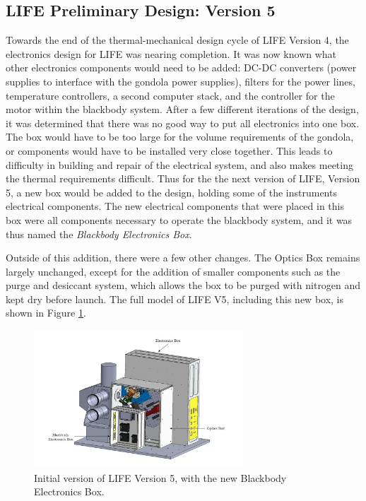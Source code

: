 \subsection{LIFE Preliminary Design: Version 5}
Towards the end of the thermal-mechanical design cycle of LIFE Version 4, the electronics design for LIFE was nearing completion. It was now known what other electronics components would need to be added: DC-DC converters (power supplies to interface with the gondola power supplies), filters for the power lines, temperature controllers, a second computer stack, and the controller for the motor within the blackbody system. After a few different iterations of the design, it was determined that there was no good way to put all electronics into one box. The box would have to be too large for the volume requirements of the gondola, or components would have to be installed very close together. This leads to difficulty in building and repair of the electrical system, and also makes meeting the thermal requirements difficult. Thus for the the next version of LIFE, Version 5, a new box would be added to the design, holding some of the instruments electrical components. The new electrical components that were placed in this box were all components necessary to operate the blackbody system, and it was thus named the \textit{Blackbody Electronics Box}. 

Outside of this addition, there were a few other changes. The Optics Box remains largely unchanged, except for the addition of smaller components such as the purge and desiccant system, which allows the box to be purged with nitrogen and kept dry before launch. The full model of LIFE V5, including this new box, is shown in Figure \ref{fig:LIFE_V5_prelim}.

\begin{figure}
    \centering
    \includegraphics[width=0.7\textwidth]{chap3_images/LIFE_V5_initial_images/LIFE_V5_prelim_labelled_jpeg.JPG}
    \caption{Initial version of LIFE Version 5, with the new Blackbody Electronics Box.}
    \label{fig:LIFE_V5_prelim}
\end{figure}

